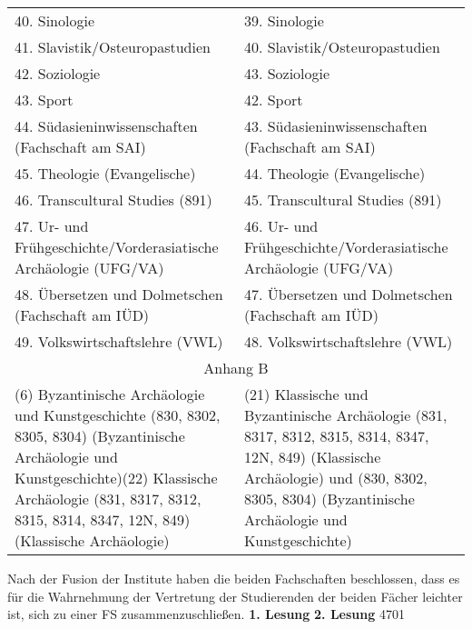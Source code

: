 {\begin{longtable}{|p{7.5cm}|p{7.5cm}|}
        40. Sinologie                                                    & 39. Sinologie                                                    \\
        41. Slavistik/Osteuropastudien                                   & 40. Slavistik/Osteuropastudien                                   \\
        42. Soziologie                                                   & 43. Soziologie                                                   \\
        43. Sport                                                        & 42. Sport                                                        \\
        44. Südasieninwissenschaften (Fachschaft am SAI)                 & 43. Südasieninwissenschaften (Fachschaft am SAI)                 \\
        45. Theologie (Evangelische)                                     & 44. Theologie (Evangelische)                                     \\
        46. Transcultural Studies (891)                                  & 45. Transcultural Studies (891)                                  \\
        47. Ur- und Frühgeschichte/Vorderasiatische Archäologie (UFG/VA) & 46. Ur- und Frühgeschichte/Vorderasiatische Archäologie (UFG/VA) \\
        48. Übersetzen und Dolmetschen (Fachschaft am IÜD)               & 47. Übersetzen und Dolmetschen (Fachschaft am IÜD)               \\
        49. Volkswirtschaftslehre (VWL)                                  & 48. Volkswirtschaftslehre (VWL)                                  \\
        \multicolumn{2}{|c|}{Anhang B}\\\hline
        (6) Byzantinische Archäologie und Kunstgeschichte (830, 8302, 8305, 8304)
        (Byzantinische Archäologie und Kunstgeschichte)\newline (22) Klassische Archäologie (831, 8317, 8312, 8315, 8314, 8347, 12N, 849) (Klassische
        Archäologie) & (21) Klassische und Byzantinische Archäologie (831, 8317, 8312, 8315, 8314, 8347,
        12N, 849) (Klassische Archäologie) und (830, 8302, 8305, 8304) (Byzantinische
        Archäologie und Kunstgeschichte)\\
    \end{longtable}
}{
    Nach der Fusion der Institute haben die beiden Fachschaften beschlossen, dass es für die Wahrnehmung der Vertretung der Studierenden der beiden Fächer leichter ist, sich zu einer FS zusammenzuschließen.
}{
    \textbf{1. Lesung}
    \ul{}
    \textbf{2. Lesung}
    \ul{}
}{47}{0}{1}

